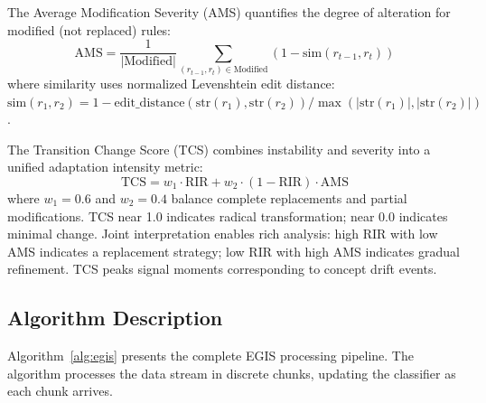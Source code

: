 \documentclass[lettersize,journal]{IEEEtran}
\begin{document}
The Average Modification Severity (AMS) quantifies the degree of alteration for modified (not replaced) rules:
\begin{equation}
    \text{AMS} = \frac{1}{|\text{Modified}|} \sum_{(r_{t-1}, r_t) \in \text{Modified}} \left(1 - \text{sim}(r_{t-1}, r_t)\right)
    \label{eq:ams}
\end{equation}
where similarity uses normalized Levenshtein edit distance: $\text{sim}(r_1, r_2) = 1 - \text{edit\_distance}(\text{str}(r_1), \text{str}(r_2)) / \max(|\text{str}(r_1)|, |\text{str}(r_2)|)$.

The Transition Change Score (TCS) combines instability and severity into a unified adaptation intensity metric:
\begin{equation}
    \text{TCS} = w_1 \cdot \text{RIR} + w_2 \cdot (1 - \text{RIR}) \cdot \text{AMS}
    \label{eq:tcs}
\end{equation}
where $w_1 = 0.6$ and $w_2 = 0.4$ balance complete replacements and partial modifications. TCS near 1.0 indicates radical transformation; near 0.0 indicates minimal change. Joint interpretation enables rich analysis: high RIR with low AMS indicates a replacement strategy; low RIR with high AMS indicates gradual refinement. TCS peaks signal moments corresponding to concept drift events.


\subsection{Algorithm Description}

Algorithm~\ref{alg:egis} presents the complete EGIS processing pipeline. The algorithm processes the data stream in discrete chunks, updating the classifier as each chunk arrives.
\end{document}
